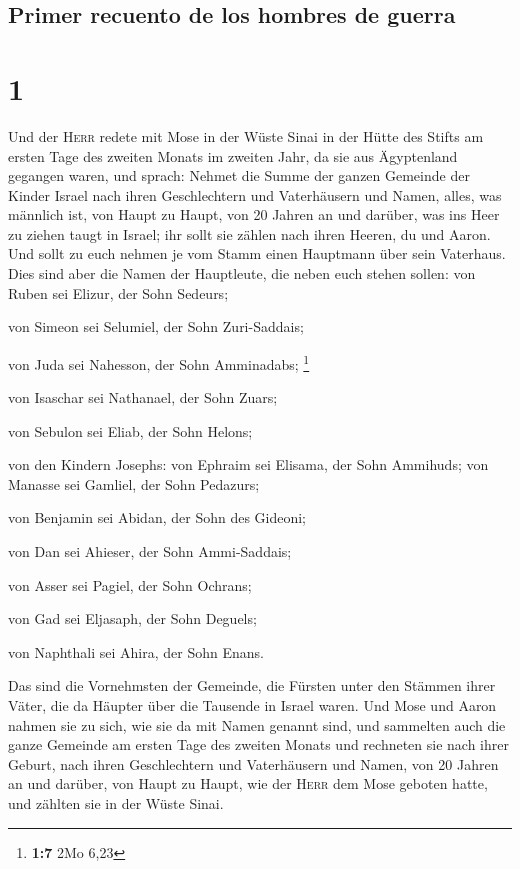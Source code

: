 \hypertarget{primer-recuento-de-los-hombres-de-guerra}{%
\subsection{Primer recuento de los hombres de
guerra}\label{primer-recuento-de-los-hombres-de-guerra}}

\hypertarget{section}{%
\section{1}\label{section}}

 Und der \textsc{Herr} redete mit Mose in der Wüste Sinai
in der Hütte des Stifts am ersten Tage des zweiten Monats im zweiten
Jahr, da sie aus Ägyptenland gegangen waren, und sprach: 
Nehmet die Summe der ganzen Gemeinde der Kinder Israel nach ihren
Geschlechtern und Vaterhäusern und Namen, alles, was männlich ist, von
Haupt zu Haupt,  von 20 Jahren an und darüber, was ins
Heer zu ziehen taugt in Israel; ihr sollt sie zählen nach ihren Heeren,
du und Aaron.  Und sollt zu euch nehmen je vom Stamm einen
Hauptmann über sein Vaterhaus.  Dies sind aber die Namen
der Hauptleute, die neben euch stehen sollen: von Ruben sei Elizur, der
Sohn Sedeurs;

 von Simeon sei Selumiel, der Sohn Zuri-Saddais;

 von Juda sei Nahesson, der Sohn Amminadabs; \footnote{\textbf{1:7}
  2Mo 6,23}

 von Isaschar sei Nathanael, der Sohn Zuars;

 von Sebulon sei Eliab, der Sohn Helons;

 von den Kindern Josephs: von Ephraim sei Elisama, der
Sohn Ammihuds; von Manasse sei Gamliel, der Sohn Pedazurs;

 von Benjamin sei Abidan, der Sohn des Gideoni;

 von Dan sei Ahieser, der Sohn Ammi-Saddais;

 von Asser sei Pagiel, der Sohn Ochrans;

 von Gad sei Eljasaph, der Sohn Deguels;

 von Naphthali sei Ahira, der Sohn Enans.

 Das sind die Vornehmsten der Gemeinde, die Fürsten unter
den Stämmen ihrer Väter, die da Häupter über die Tausende in Israel
waren.  Und Mose und Aaron nahmen sie zu sich, wie sie da
mit Namen genannt sind,  und sammelten auch die ganze
Gemeinde am ersten Tage des zweiten Monats und rechneten sie nach ihrer
Geburt, nach ihren Geschlechtern und Vaterhäusern und Namen, von 20
Jahren an und darüber, von Haupt zu Haupt,  wie der
\textsc{Herr} dem Mose geboten hatte, und zählten sie in der Wüste
Sinai.

